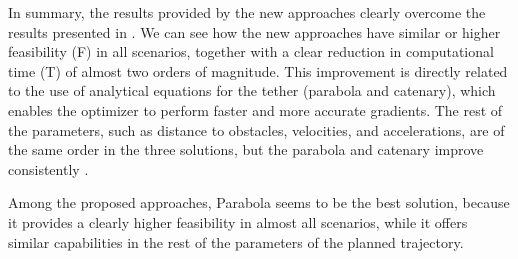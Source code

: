 In summary, the results provided by the new approaches clearly overcome the results presented in \cite{smartinezr2023}. We can see how the new approaches have similar or higher feasibility (F) in all scenarios, together with a clear reduction in computational time (T) of almost two orders of magnitude. This improvement is directly related to the use of analytical equations for the tether (parabola and catenary), which enables the optimizer to perform faster and more accurate gradients. The rest of the parameters, such as distance to obstacles, velocities, and accelerations, are of the same order in the three solutions, but the parabola and catenary improve consistently \cite{smartinezr2023}. 

Among the proposed approaches, Parabola seems to be the best solution, because it provides a clearly higher feasibility in almost all scenarios, while it offers similar capabilities in the rest of the parameters of the planned trajectory. 
